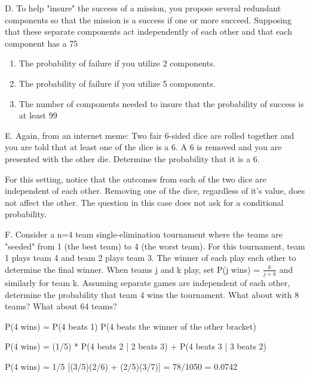 \documentclass[10pt,]{book}
\theoremstyle{plain}
\theoremstyle{definition}
\theoremstyle{definition}
\theoremstyle{definition}
\numberwithin{equation}{section}
\begin{document}
\par

	D.  To help "insure" the success of a mission, you propose several redundant components so that the mission is a success if one or more succeed. Supposing that these separate components act independently of each other and that each component has a 75%
	\leavevmode%
\begin{enumerate}
\item\hypertarget{li-153}{}The probability of failure if you utilize 2 components.%
\item\hypertarget{li-154}{}The probability of failure if you utilize 5 components.%
\item\hypertarget{li-155}{}The number of components needed to insure that the probability of success is at least 99%
\end{enumerate}

\par

	E.  Again, from an internet meme:  Two fair 6-sided dice are rolled together and you are told that at least one of the dice is a 6. A 6 is removed and you are presented with the other die.  Determine the probability that it is a 6.

	For this setting, notice that the outcomes from each of the two dice are independent of each other. Removing one of the dice, regardless of it's value, does not affect the other. The question in this case does not ask for a conditional probability.
\par

	F.  Consider a n=4 team single-elimination tournament where the teams are "seeded" from 1 (the best team) to 4 (the worst team).  For this tournament, team 1 plays team 4 and team 2 plays team 3. The winner of each play each other to determine the final winner. When teams j and k play, set P(j wins) = \(\frac{k}{j+k}\) and similarly for team k.  Assuming separate games are independent of each other, determine the probability that team 4 wins the tournament. What about with 8 teams? What about 64 teams?

	P(4 wins) = P(4 beats 1) P(4 beats the winner of the other bracket)
\par

	P(4 wins) = (1/5) * P(4 beats 2 | 2 beats 3) + P(4 beats 3 | 3 beats 2)
\par

	P(4 wins) = 1/5 [(3/5)(2/6) + (2/5)(3/7)] = 78/1050 = 0.0742
\par
\end{document}
